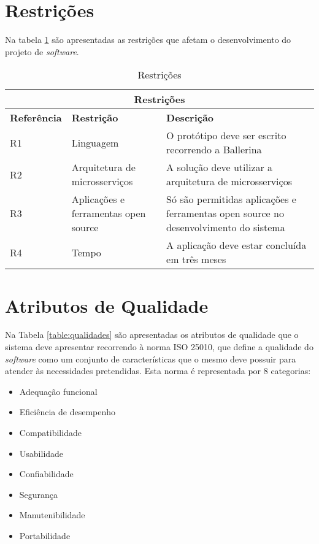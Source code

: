 \newpage

\section{Restrições}

Na tabela \ref{table:restricoes} são apresentadas as restrições que afetam o desenvolvimento do projeto de \textit{software}.

\begin{table}[H]
\caption{Restrições}
\label{table:restricoes}
\begin{center}
\begin{tabular}{ |p{3cm}|p{3cm}|p{6cm}|  }
\hline
\multicolumn{3}{|c|}{Restrições} \\
\hline
\textbf{Referência} & \textbf{Restrição} & \textbf{Descrição} \\
\hline
R1 & Linguagem & O protótipo deve ser escrito recorrendo a Ballerina\\
\hline
R2 & Arquitetura de microsserviços &  A solução deve utilizar a arquitetura de microsserviços\\
\hline
R3 & Aplicações e ferramentas open source & Só são permitidas aplicações e ferramentas open source no desenvolvimento do sistema\\
\hline
R4 & Tempo & A aplicação deve estar concluída em três meses\\
\hline
\end{tabular} 
\end{center}
\end{table}


\section{Atributos de Qualidade}

Na Tabela \ref{table:qualidades} são apresentadas os atributos de qualidade que o sistema deve apresentar recorrendo à norma ISO 25010, que define a qualidade do \textit{software} como um conjunto de características que o mesmo deve possuir para atender às necessidades pretendidas. Esta norma é representada por 8 categorias:
\begin{itemize}
    \item Adequação funcional \cite{iso25010cat}
    \item Eficiência de desempenho \cite{iso25010cat}
    \item Compatibilidade \cite{iso25010cat}
    \item Usabilidade \cite{iso25010cat}
    \item Confiabilidade \cite{iso25010cat}
    \item Segurança \cite{iso25010cat}
    \item Manutenibilidade \cite{iso25010cat}
    \item Portabilidade \cite{iso25010cat}
\end{itemize}

